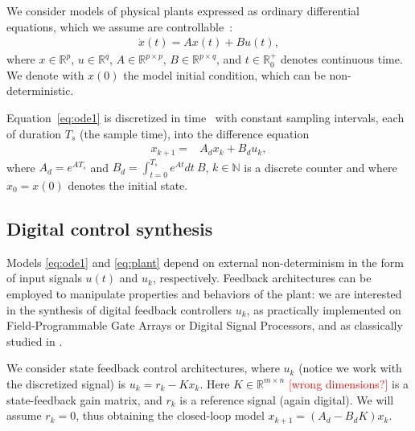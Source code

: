 \documentclass[twocolumn]{autart}    %
\newcommand{\mat}[1]{{#1}}
\renewcommand{\vec}[1]{{#1}}
\renewcommand{\note}[1]{\textcolor{red}{[#1]}}
\begin{document}
We consider models of physical plants expressed as ordinary differential
equations, which we assume are controllable~\cite{Astrom08}: 
%
\begin{align}
\label{eq:ode1}
\dot{x}(t) = \mat{A}\vec{x}(t)+ \mat{B} \vec{u}(t), 
\end{align}
%
where 
$\vec{x} \in \mathbb{R}^p$,  
$\vec{u} \in \mathbb{R}^q$, 
$\mat{A} \in \mathbb{R}^{p \times p}$, 
$\mat{B} \in \mathbb{R}^{p \times q}$,
and $t \in \mathbb R_0^+$ denotes continuous time. 
We denote with $x(0)$ the model initial condition, which can be non-deterministic. 

Equation~\eqref{eq:ode1} is 
discretized in time~\cite{middleton1990digital,van1978computing} with constant sampling intervals, 
each of duration $T_s$ (the sample time), 
into the difference equation
%
\begin{align}
\label{eq:plant}
\vec{x}_{k+1} =& \mat{A}_d \vec{x}_k+ \mat{B}_d \vec{u}_k, 
\end{align} 
where 
$\mat{A}_d=e^{\mat{A}T_s}$ and 
$\mat{B}_d = \int_{t = 0}^{T_s} e^{\mat{A} t} dt\ \mat{B}$, 
$k \in \mathbb N$ is a discrete counter and where $\vec{x}_{0}=\vec{x}(0)$ denotes the initial state.  

\subsection{Digital control synthesis}

Models \eqref{eq:ode1} and \eqref{eq:plant} depend on external non-determinism in the form of input signals $u (t)$ and  $u_k$, respectively. 
Feedback architectures can be employed to manipulate properties and behaviors of the plant:    
we are interested in the synthesis of digital feedback controllers $u_k$,  
as practically implemented on Field-Programmable Gate Arrays or Digital Signal Processors,  
and as classically studied in \cite{astrom1997computer}. 

We consider state feedback control architectures, 
where $u_k$ (notice we work with the discretized signal) is $u_k = r_{k} - K x_k$. 
Here $K \in \mathbb{R}^{m \times n}$ \note{wrong dimensions?} is a state-feedback gain matrix, 
and $r_{k}$ is a reference signal (again digital). 
We will assume $r_k=0$, thus obtaining the closed-loop model 
$\vec{x}_{k+1}=(\mat{A}_d-\mat{B}_d\mat{K})\vec{x}_k$. 
\end{document}
